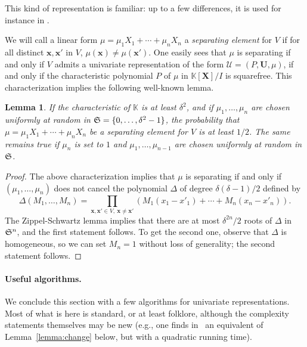 \documentclass[12pt]{article}
\def\K {\ensuremath{\mathbb{K}}}
\def\Uu {\ensuremath{\mathbf{U}}}
\def\x {\ensuremath{\mathbf{x}}}
\def\X {\ensuremath{\mathbf{X}}}
\def\Ur {\ensuremath{\mathscr U}}
\newtheorem{Lemma}{Lemma}
\begin{document}
This kind of representation is familiar: up to a few differences, it
is used for instance in
\cite{GiMo89,AlBeRoWo96,Rouillier99,GiHeMoPa95,GiLeSa01}.

We will call a linear form $\mu=\mu_1 X_1 + \cdots+ \mu_n X_n$ a {\em
  separating element} for $V$ if for all distinct $\x,\x'$ in $V$,
$\mu(\x)\ne\mu(\x')$. One easily sees that $\mu$ is separating if and
only if $V$ admits a univariate representation of the form
$\Ur=(P,\Uu,\mu)$, if and only if the characteristic polynomial $P$ of
$\mu$ in $\K[\X]/I$ is squarefree. This characterization implies the
following well-known lemma.
\begin{Lemma}\label{lemma:prob}
  If the characteristic of $\K$ is at least $\delta^2$, and if
  $\mu_1,\dots,\mu_n$ are chosen uniformly at random in ${\frak
    S}=\{0,\dots,\delta^2-1\}$, the probability that $\mu=\mu_1 X_1
  +\cdots +\mu_n X_n$ be a separating element for $V$ is at least
  $1/2$. The same remains true if $\mu_n$ is set to $1$ and
  $\mu_1,\dots,\mu_{n-1}$ are chosen uniformly at random in ${\frak
    S}$.
\end{Lemma}
\begin{proof}
  The above characterization implies that $\mu$ is separating if and
  only if $(\mu_1,\dots,\mu_n)$ does not cancel the polynomial
  $\Delta$ of degree $\delta(\delta-1)/2$ defined by
  $$\Delta(M_1,\dots,M_n)=\prod_{\x,\x' \in V,\ \x\ne\x'} \left
  (M_1(x_1-x'_1) + \cdots + M_n(x_n-x'_n)\right).$$ The
  Zippel-Schwartz lemma implies that there are at most $\delta^{2n}/2$
  roots of $\Delta$ in ${\frak S}^n$, and the first statement
  follows. To get the second one, observe that $\Delta$ is
  homogeneous, so we can set $M_n=1$ without loss of generality; the
  second statement follows.
\end{proof}

\paragraph{Useful algorithms.} We conclude this section with a few
algorithms for univariate representations. Most of what is here is
standard, or at least folklore, although the complexity statements
themselves may be new (e.g., one finds in~\cite{GiLeSa01} an
equivalent of Lemma~\ref{lemma:change} below, but with a quadratic
running time).
\end{document}
